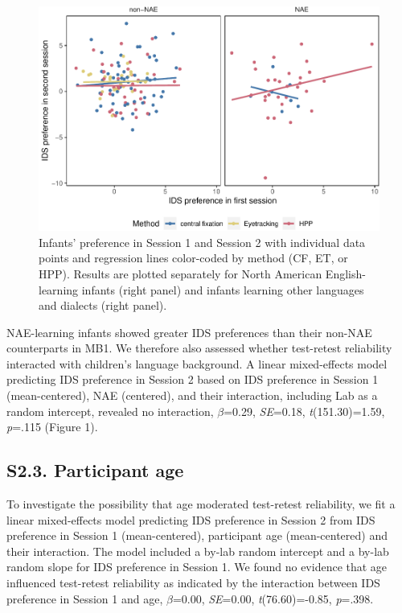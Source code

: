 \documentclass[
  man, donotrepeattitle,floatsintext]{apa6}
\begin{document}
\begin{figure}
\centering
\includegraphics{MB1T_supplement_files/figure-latex/fig1-1.pdf}
\caption{\label{fig:fig1}Infants' preference in Session 1 and Session 2 with individual data points and regression lines color-coded by method (CF, ET, or HPP). Results are plotted separately for North American English-learning infants (right panel) and infants learning other languages and dialects (right panel).}
\end{figure}

NAE-learning infants showed greater IDS preferences than their non-NAE counterparts in MB1.
We therefore also assessed whether test-retest reliability interacted with children's language background.
A linear mixed-effects model predicting IDS preference in Session 2 based on IDS preference in Session 1 (mean-centered), NAE (centered), and their interaction, including Lab as a random intercept, revealed no interaction, \(\beta\)=0.29, \emph{SE}=0.18, \emph{t}(151.30)=1.59, \emph{p}=.115 (Figure 1).

\hypertarget{s2.3.-participant-age}{%
\subsection{S2.3. Participant age}\label{s2.3.-participant-age}}

To investigate the possibility that age moderated test-retest reliability, we fit a linear mixed-effects model predicting IDS preference in Session 2 from IDS preference in Session 1 (mean-centered), participant age (mean-centered) and their interaction.
The model included a by-lab random intercept and a by-lab random slope for IDS preference in Session 1.
We found no evidence that age influenced test-retest reliability as indicated by the interaction between IDS preference in Session 1 and age, \(\beta\)=0.00, \emph{SE}=0.00, \emph{t}(76.60)=-0.85, \emph{p}=.398.
\end{document}
